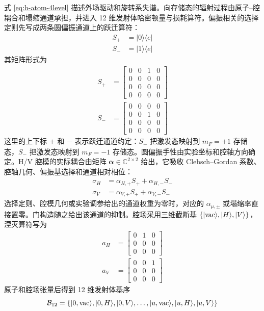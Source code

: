 式 \eqref{eq:h-atom-4level} 描述外场驱动和旋转系失谐。向存储态的辐射过程由原子--腔耦合和塌缩通道承担，并进入 12 维发射体哈密顿量与损耗算符。偏振相关的选择定则先写成两条圆偏振通道上的跃迁算符：
\begin{align}
S_+ &= |0\rangle\langle e|\\
S_- &= |1\rangle\langle e|
\end{align}
其矩阵形式为
\begin{align}
S_+&=
\begin{bmatrix}
0&0&1&0\\
0&0&0&0\\
0&0&0&0\\
0&0&0&0
\end{bmatrix}
\label{eq:splus-matrix}\\
S_-&=
\begin{bmatrix}
0&0&0&0\\
0&0&1&0\\
0&0&0&0\\
0&0&0&0
\end{bmatrix}
\label{eq:sminus-matrix}
\end{align}
这里的上下标 $+$ 和 $-$ 表示跃迁通道约定：$S_+$ 把激发态映射到 $m_F=+1$ 存储态，$S_-$ 把激发态映射到 $m_F=-1$ 存储态。圆偏振手性由实验坐标和腔轴方向确定。H/V 腔模的实际耦合由矩阵 $\boldsymbol{\alpha}\in\mathbb{C}^{2\times 2}$ 给出，它吸收 Clebsch--Gordan 系数、腔轴几何、偏振基选择和通道相对相位：
\begin{align}
\sigma_H &= \alpha_{H,+}S_+ + \alpha_{H,-}S_-\\
\sigma_V &= \alpha_{V,+}S_+ + \alpha_{V,-}S_-
\label{eq:sigma-hv}
\end{align}
选择定则、腔模几何或实验调参给出的通道权重为零时，对应的 $\alpha_{\mu,\pm}$ 或塌缩率直接置零。门构造随之给出该通道的抑制。腔场采用三维截断基 $\{|{\rm vac}\rangle,|H\rangle,|V\rangle\}$，湮灭算符写为
\begin{align}
a_H&=
\begin{bmatrix}
0&1&0\\
0&0&0\\
0&0&0
\end{bmatrix}
\label{eq:cavity-a-h}\\
a_V&=
\begin{bmatrix}
0&0&1\\
0&0&0\\
0&0&0
\end{bmatrix}
\label{eq:cavity-a-v}
\end{align}
原子和腔场张量后得到 12 维发射体基序
\begin{equation}
\mathcal{B}_{12}=
\{|0,{\rm vac}\rangle,|0,H\rangle,|0,V\rangle,\ldots,|u,{\rm vac}\rangle,|u,H\rangle,|u,V\rangle\}
\label{eq:basis-12d-emitter}
\end{equation}
